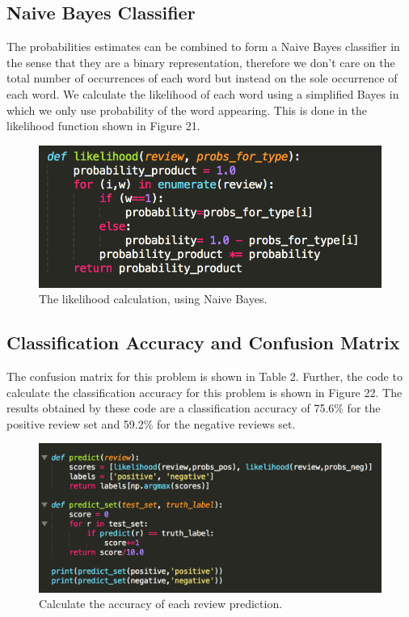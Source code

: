\documentclass[12pt, letter]{article}
\begin{document}
\FloatBarrier

\subsection{Naive Bayes Classifier}

The probabilities estimates can be combined to form a Naive Bayes classifier in the sense that they are a binary representation, therefore we don't care on the total number of occurrences of each word but instead on the sole occurrence of each word. We calculate the likelihood of each word using a simplified Bayes in which we only use probability of the word appearing. This is done in the likelihood function shown in Figure 21. 

 \begin{figure}[htb]
  \centering
  \includegraphics[width=0.7 \textwidth]{./figures/likelihood.png}
  \caption{The likelihood calculation, using Naive Bayes.}
\end{figure}

\FloatBarrier

\subsection{Classification Accuracy and Confusion Matrix}

The confusion matrix for this problem is shown in Table 2. Further, the code to calculate the classification accuracy for this problem is shown in Figure 22. The results obtained by these code are a classification accuracy of 75.6\% for the positive review set and 59.2\% for the negative reviews set.

 \begin{figure}[htb]
  \centering
  \includegraphics[width=0.7 \textwidth]{./figures/code_accuracy.png}
  \caption{Calculate the accuracy of each review prediction.}
\end{figure}
\end{document}
